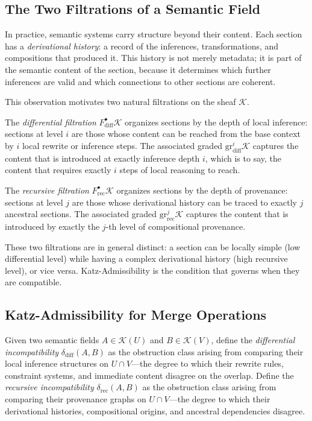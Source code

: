 \documentclass[12pt]{article}
\begin{document}
\subsection{The Two Filtrations of a Semantic Field}

In practice, semantic systems carry structure beyond their content. Each section has a
\emph{derivational history}: a record of the inferences, transformations, and
compositions that produced it. This history is not merely metadata; it is part of the
semantic content of the section, because it determines which further inferences are
valid and which connections to other sections are coherent.

This observation motivates two natural filtrations on the sheaf $\mathcal{K}$.

The \emph{differential filtration} $F^\bullet_{\mathrm{diff}} \mathcal{K}$ organizes
sections by the depth of local inference: sections at level $i$ are those whose
content can be reached from the base context by $i$ local rewrite or inference steps.
The associated graded $\mathrm{gr}^i_{\mathrm{diff}} \mathcal{K}$ captures the content
that is introduced at exactly inference depth $i$, which is to say, the content that
requires exactly $i$ steps of local reasoning to reach.

The \emph{recursive filtration} $F^\bullet_{\mathrm{rec}} \mathcal{K}$ organizes
sections by the depth of provenance: sections at level $j$ are those whose derivational
history can be traced to exactly $j$ ancestral sections. The associated graded
$\mathrm{gr}^j_{\mathrm{rec}} \mathcal{K}$ captures the content that is introduced by
exactly the $j$-th level of compositional provenance.

These two filtrations are in general distinct: a section can be locally simple (low
differential level) while having a complex derivational history (high recursive level),
or vice versa. Katz-Admissibility is the condition that governs when they are
compatible.

\subsection{Katz-Admissibility for Merge Operations}

Given two semantic fields $A \in \mathcal{K}(U)$ and $B \in \mathcal{K}(V)$, define
the \emph{differential incompatibility} $\delta_{\mathrm{diff}}(A,B)$ as the
obstruction class arising from comparing their local inference structures on
$U \cap V$---the degree to which their rewrite rules, constraint systems, and
immediate content disagree on the overlap. Define the \emph{recursive incompatibility}
$\delta_{\mathrm{rec}}(A,B)$ as the obstruction class arising from comparing their
provenance graphs on $U \cap V$---the degree to which their derivational histories,
compositional origins, and ancestral dependencies disagree.
\end{document}

